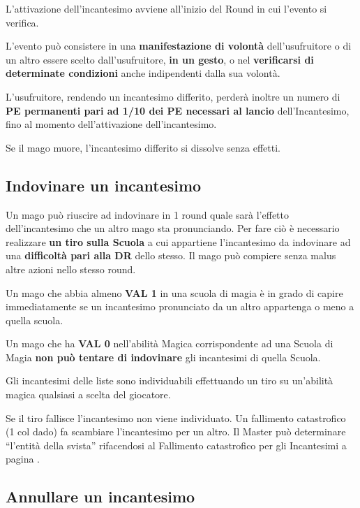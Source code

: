 L'attivazione dell'incantesimo avviene all'inizio del Round in cui
l'evento si verifica.

L'evento pu\`o consistere in una \textbf{manifestazione di
  volont\`a} dell'usufruitore o di un altro essere scelto
dall'usufruitore, \textbf{in un gesto}, o nel \textbf{verificarsi di
  determinate condizioni} anche indipendenti dalla sua volont\`a.

L'usufruitore, rendendo un incantesimo differito, perder\`a inoltre
un numero di \textbf{PE permanenti pari ad 1/10 dei PE necessari al
  lancio} dell'Incantesimo, fino al momento dell'attivazione
dell'incantesimo.

Se il mago muore, l'incantesimo differito si dissolve senza effetti.

\iffullversion
\subsection{Indovinare un incantesimo}

Un mago pu\`o riuscire ad indovinare in 1 round quale sar\`a
l'effetto dell'incantesimo che un altro mago sta pronunciando. Per
fare ci\`o \`e necessario realizzare \textbf{un tiro sulla Scuola}
a cui appartiene l'incantesimo da indovinare ad una
\textbf{difficolt\`a pari alla DR} dello stesso. Il mago pu\`o
compiere senza malus altre azioni nello stesso round.

Un mago che abbia almeno \textbf{VAL 1} in una scuola di magia \`e
in grado di capire immediatamente se un incantesimo pronunciato da un
altro appartenga o meno a quella scuola.

Un mago che ha \textbf{VAL 0} nell'abilit\`a Magica corrispondente
ad una Scuola di Magia \textbf{non pu\`o tentare di indovinare} gli
incantesimi di quella Scuola.

Gli incantesimi delle liste sono individuabili effettuando un tiro su
un'abilit\`a magica qualsiasi a scelta del giocatore. 

Se il tiro fallisce l'incantesimo non viene individuato. Un fallimento
catastrofico (1 col dado) fa scambiare l'incantesimo per un altro. 
Il Master pu\`o determinare ``l'entit\`a della svista'' rifacendosi al
Fallimento catastrofico per gli Incantesimi a pagina \pageref{fumblemagia}.
\fi

\subsection{Annullare un incantesimo}

